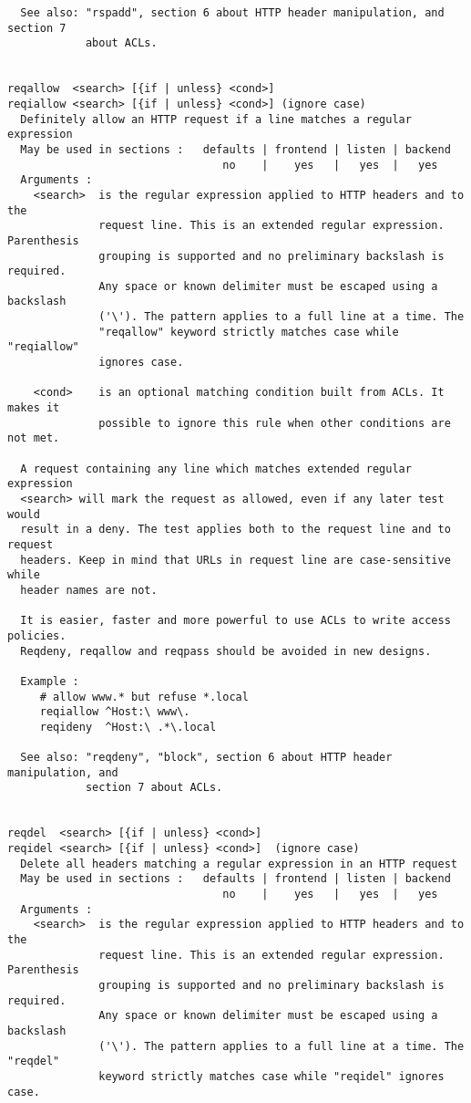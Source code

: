 \begin{verbatim}
  See also: "rspadd", section 6 about HTTP header manipulation, and section 7
            about ACLs.


reqallow  <search> [{if | unless} <cond>]
reqiallow <search> [{if | unless} <cond>] (ignore case)
  Definitely allow an HTTP request if a line matches a regular expression
  May be used in sections :   defaults | frontend | listen | backend
                                 no    |    yes   |   yes  |   yes
  Arguments :
    <search>  is the regular expression applied to HTTP headers and to the
              request line. This is an extended regular expression. Parenthesis
              grouping is supported and no preliminary backslash is required.
              Any space or known delimiter must be escaped using a backslash
              ('\'). The pattern applies to a full line at a time. The
              "reqallow" keyword strictly matches case while "reqiallow"
              ignores case.

    <cond>    is an optional matching condition built from ACLs. It makes it
              possible to ignore this rule when other conditions are not met.

  A request containing any line which matches extended regular expression
  <search> will mark the request as allowed, even if any later test would
  result in a deny. The test applies both to the request line and to request
  headers. Keep in mind that URLs in request line are case-sensitive while
  header names are not.

  It is easier, faster and more powerful to use ACLs to write access policies.
  Reqdeny, reqallow and reqpass should be avoided in new designs.

  Example :
     # allow www.* but refuse *.local
     reqiallow ^Host:\ www\.
     reqideny  ^Host:\ .*\.local

  See also: "reqdeny", "block", section 6 about HTTP header manipulation, and
            section 7 about ACLs.


reqdel  <search> [{if | unless} <cond>]
reqidel <search> [{if | unless} <cond>]  (ignore case)
  Delete all headers matching a regular expression in an HTTP request
  May be used in sections :   defaults | frontend | listen | backend
                                 no    |    yes   |   yes  |   yes
  Arguments :
    <search>  is the regular expression applied to HTTP headers and to the
              request line. This is an extended regular expression. Parenthesis
              grouping is supported and no preliminary backslash is required.
              Any space or known delimiter must be escaped using a backslash
              ('\'). The pattern applies to a full line at a time. The "reqdel"
              keyword strictly matches case while "reqidel" ignores case.


\end{verbatim}
